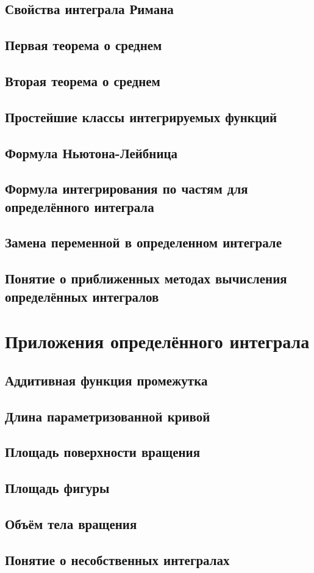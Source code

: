 \subsection{Свойства интеграла Римана}

\subsection{Первая теорема о среднем}

\subsection{Вторая теорема о среднем}
\subsection{Простейшие классы интегрируемых функций}
\subsection{Формула Ньютона-Лейбница}
\subsection{Формула интегрирования по частям для определённого интеграла}
\subsection{Замена переменной в определенном интеграле}
\subsection{Понятие о приближенных методах вычисления определённых интегралов}


\section{Приложения определённого интеграла}
\subsection{Аддитивная функция промежутка}

\subsection{Длина параметризованной кривой} 
\subsection{Площадь поверхности вращения}
\subsection{Площадь фигуры}
\subsection{Объём тела вращения}
\subsection{Понятие о несобственных интегралах}


